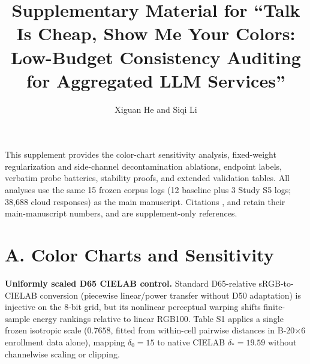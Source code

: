 \documentclass[10pt,letterpaper]{article}
\title{Supplementary Material for ``Talk Is Cheap, Show Me Your Colors: Low-Budget Consistency Auditing for Aggregated LLM Services''}
\author{Xiguan He and Siqi Li}
\date{}
\theoremstyle{definition}
\begin{document}
\maketitle
\setcounter{tocdepth}{1}
\tableofcontents
\clearpage
This supplement provides the color-chart sensitivity analysis, fixed-weight regularization and side-channel decontamination ablations, endpoint labels, verbatim probe batteries, stability proofs, and extended validation tables. All analyses use the same 15 frozen corpus logs (12 baseline plus 3 Study S5 logs; 38,688 cloud responses) as the main manuscript. Citations \cite{ref4,ref16}, and \cite{ref25,ref26,ref27,ref28,ref29,ref30} retain their main-manuscript numbers, and \cite{ref31,ref32,ref33} are supplement-only references.


\section*{A. Color Charts and Sensitivity}\label{app:color-charts}

\textbf{Uniformly scaled D65 CIELAB control.} Standard D65-relative sRGB-to-CIELAB conversion \cite{ref25,ref31,ref32} (piecewise linear/power transfer without D50 adaptation) is injective on the 8-bit grid, but its nonlinear perceptual warping shifts finite-sample energy rankings relative to linear RGB100. Table S1 applies a single frozen isotropic scale ($0.7658$, fitted from within-cell pairwise distances in B-20\ensuremath{\times}6 enrollment data alone), mapping $\delta_0=15$ to native CIELAB $\delta_*=19.59$ without channelwise scaling or clipping.
\end{document}
